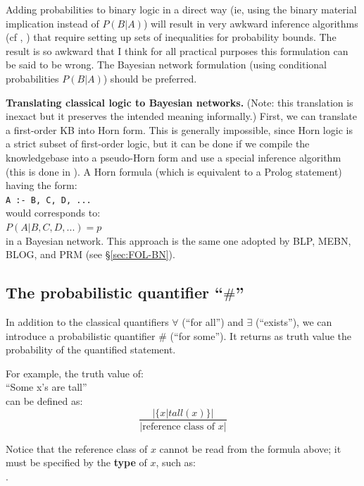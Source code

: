 Adding probabilities to binary logic in a direct way (ie, using the binary material implication instead of $P(B|A)$) will result in very awkward inference algorithms (cf \citep*{Ng1992}, \citep*{Nilsson1986}) that require setting up sets of inequalities for probability bounds.  The result is so awkward that I think for all practical purposes this formulation can be said to be wrong.  The Bayesian network formulation (using conditional probabilities $P(B|A)$) should be preferred.

\textbf{Translating classical logic to Bayesian networks.}  (Note:  this translation is inexact but it preserves the intended meaning informally.)  First, we can translate a first-order KB into Horn form.  This is generally impossible, since Horn logic is a strict subset of first-order logic, but it can be done if we compile the knowledgebase into a pseudo-Horn form and use a special inference algorithm (this is done in \citep*{Stickel1988}).  A Horn formula (which is equivalent to a Prolog statement) having the form:\\
\hspace*{1cm} \texttt{A :- B, C, D, ...}\\
would corresponds to:\\
\hspace*{1cm} $ P(A | B, C, D, ...) = p $\\
in a Bayesian network.  This approach is the same one adopted by BLP, MEBN, BLOG, and PRM (see \S\ref{sec:FOL-BN}).

\subsection{The probabilistic quantifier ``$\#$''}
\label{sec:probabilistic-quantifier}

In addition to the classical quantifiers $\forall$ (``for all'') and $\exists$ (``exists''), we can introduce a probabilistic quantifier $\#$ (``for some'').  It returns as truth value the probability of the quantified statement.

For example, the truth value of:\\
\hspace*{1cm}  \hspace*{5cm} ``Some x's are tall''\\
can be defined as:\\
$$ \frac{|\{ x | tall(x) \}|}{| \mbox{reference class of } x |} $$

Notice that the reference class of $x$ cannot be read from the formula above; it must be specified by the \textbf{type} of $x$, such as:\\
\hspace*{1cm} .

